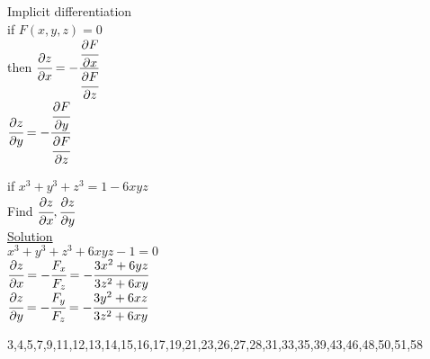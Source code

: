 \noindent{\color{smalt(darkpowderblue)}\rule{\linewidth}{.2mm}}
\begin{definition}
Implicit differentiation\\
if $F(x,y,z)=0$\\
then $\cfrac{\partial z}{\partial x}=-\cfrac{\cfrac{\partial F}{\partial x}}{\cfrac{\partial F}{\partial z}}$\\
$\cfrac{\partial z}{\partial y}=-\cfrac{\cfrac{\partial F}{\partial y}}{\cfrac{\partial F}{\partial z}}$
\end{definition}
\noindent{\color{smalt(darkpowderblue)}\rule{\linewidth}{.2mm}}
\begin{example}
if $x^3+y^3+z^3=1-6x y z$\\
Find $\cfrac{\partial z}{\partial x},\cfrac{\partial z}{\partial y}$\\
\underline{\color{smalt(darkpowderblue)}Solution}\\
$x^3+y^3+z^3+6xyz-1=0$\\
$\cfrac{\partial z}{\partial x}=-\cfrac{F_x}{F_z}=-\cfrac{3x^2+6yz}{3z^2+6xy}$\\
$\cfrac{\partial z}{\partial y}=-\cfrac{F_y}{F_z}=-\cfrac{3y^2+6xz}{3z^2+6xy}$
\end{example}
\noindent{\color{smalt(darkpowderblue)}\rule{\linewidth}{.2mm}}
\begin{problem}
3,4,5,7,9,11,12,13,14,15,16,17,19,21,23,26,27,28,31,33,35,39,43,46,48,50,51,58
\end{problem}